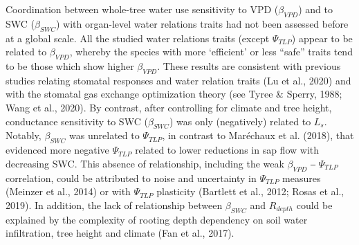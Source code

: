 \documentclass[11pt,twoside]{reedthesis}
\begin{document}
Coordination between whole-tree water use sensitivity to VPD
(\(\beta_{VPD}\)) and to SWC (\(\beta_{SWC}\)) with organ-level water
relations traits had not been assessed before at a global scale. All the
studied water relations traits (except \(\Psi_{TLP}\)) appear to be
related to \(\beta_{VPD}\), whereby the species with more `efficient' or
less ``safe'' traits tend to be those which show higher \(\beta_{VPD}\).
These results are consistent with previous studies relating stomatal
responses and water relation traits (Lu et al., 2020) and with the
stomatal gas exchange optimization theory (see Tyree \& Sperry, 1988;
Wang et al., 2020). By contrast, after controlling for climate and tree
height, conductance sensitivity to SWC (\(\beta_{SWC}\)) was only
(negatively) related to \(L_s\). Notably, \(\beta_{SWC}\) was unrelated
to \(\Psi_{TLP}\), in contrast to Maréchaux et al. (2018), that
evidenced more negative \(\Psi_{TLP}\) related to lower reductions in
sap flow with decreasing SWC. This absence of relationship, including
the weak \(\beta_{VPD}\) ‒ \(\Psi_{TLP}\) correlation, could be
attributed to noise and uncertainty in \(\Psi_{TLP}\) measures (Meinzer
et al., 2014) or with \(\Psi_{TLP}\) plasticity (Bartlett et al., 2012;
Rosas et al., 2019). In addition, the lack of relationship between
\(\beta_{SWC}\) and \(R_{depth}\) could be explained by the complexity
of rooting depth dependency on soil water infiltration, tree height and
climate (Fan et al., 2017).\par
\end{document}

